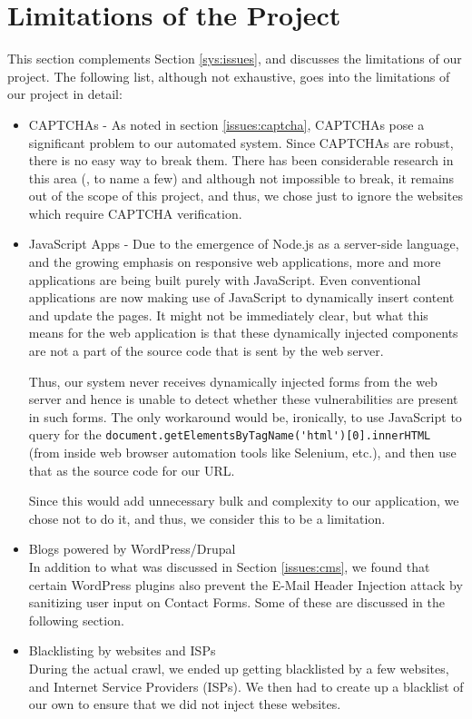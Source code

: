 \section[Limitations]{Limitations of the Project}
	This section complements Section \ref{sys:issues}, and discusses the limitations of our project. The following list, although not exhaustive, goes into the limitations of our project in detail: 
	\begin{itemize}
		\item CAPTCHAs - As noted in section \ref*{issues:captcha}, CAPTCHAs pose a significant problem to our automated system. Since CAPTCHAs are robust, there is no easy way to break them. There has been considerable research in this area (\cite{captchas}, \cite{captchas2} to name a few) and although not impossible to break, it remains out of the scope of this project, and thus, we chose just to ignore the websites which require CAPTCHA verification.
		\item JavaScript Apps - Due to the emergence of Node.js as a server-side language, and the growing emphasis on responsive web applications, more and more applications are being built purely with JavaScript. Even conventional applications are now making use of JavaScript to dynamically insert content and update the pages. It might not be immediately clear, but what this means for the web application is that these dynamically injected components are not a part of the source code that is sent by the web server.
		
		Thus, our system never receives dynamically injected forms from the web server and hence is unable to detect whether these vulnerabilities are present in such forms. The only workaround would be, ironically, to use JavaScript to query for the \lstinline|document.getElementsByTagName('html')[0].innerHTML| (from inside web browser automation tools like Selenium, etc.), and then use that as the source code for our URL.
		
		Since this would add unnecessary bulk and complexity to our application, we chose not to do it, and thus, we consider this to be a limitation.
		\item Blogs powered by WordPress/Drupal\\
		In addition to what was discussed in Section \ref{issues:cms}, we found that certain WordPress plugins also prevent the E-Mail Header Injection attack by sanitizing user input on Contact Forms. Some of these are discussed in the following section.
		
		\item Blacklisting by websites and ISPs\\
		During the actual crawl, we ended up getting blacklisted by a few websites, and Internet Service Providers (ISPs). We then had to create up a blacklist of our own to ensure that we did not inject these websites.
		

\end{itemize}
